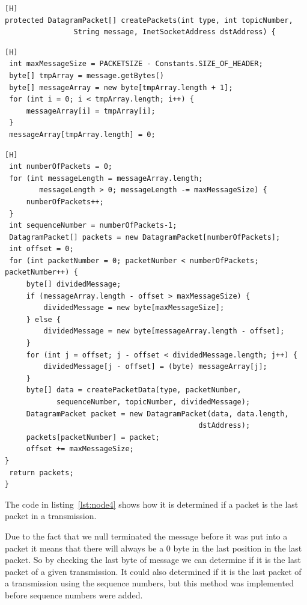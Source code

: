 \documentclass{article}
\begin{document}
\begin{lstlisting}[caption={[Sample Code 2]This is the function header for createPackets() method}, label={lst:node1}][H]
protected DatagramPacket[] createPackets(int type, int topicNumber, 
				String message, InetSocketAddress dstAddress) {
\end{lstlisting}
\begin{lstlisting}[caption={[Sample Code 2]This code takes the message string and ensures that it is null terminated, this is helpful for packet handling on the receiving side of the communication}, label={lst:node2}][H]
 int maxMessageSize = PACKETSIZE - Constants.SIZE_OF_HEADER;
 byte[] tmpArray = message.getBytes()
 byte[] messageArray = new byte[tmpArray.length + 1];
 for (int i = 0; i < tmpArray.length; i++) {
	 messageArray[i] = tmpArray[i];
 }
 messageArray[tmpArray.length] = 0;
\end{lstlisting}
\begin{lstlisting}[caption={[Sample Code 2]A for-loop is used to calculate how many packets are required to send the message. After this a second for-loop is used to split the message array up into separate packets, only if the message was too long for a single packet}, label={lst:node3}][H]
 int numberOfPackets = 0;
 for (int messageLength = messageArray.length; 
		messageLength > 0; messageLength -= maxMessageSize) {
	 numberOfPackets++;
 }
 int sequenceNumber = numberOfPackets-1;
 DatagramPacket[] packets = new DatagramPacket[numberOfPackets];
 int offset = 0;
 for (int packetNumber = 0; packetNumber < numberOfPackets; packetNumber++) {
	 byte[] dividedMessage;
	 if (messageArray.length - offset > maxMessageSize) {
	  	 dividedMessage = new byte[maxMessageSize];
	 } else {
		 dividedMessage = new byte[messageArray.length - offset];
	 }
	 for (int j = offset; j - offset < dividedMessage.length; j++) {
		 dividedMessage[j - offset] = (byte) messageArray[j];
	 }
	 byte[] data = createPacketData(type, packetNumber, 
			sequenceNumber, topicNumber, dividedMessage);
	 DatagramPacket packet = new DatagramPacket(data, data.length,
											 dstAddress);
	 packets[packetNumber] = packet;
	 offset += maxMessageSize;
}
 return packets;
}
\end{lstlisting}

The code in listing~\ref{lst:node4} shows how it is determined if a packet is the last packet in a transmission.

Due to the fact that we null terminated the message before it was put into a packet it means that there will always be a 0 byte in the last position in the last packet. So by checking the last byte of message we can determine if it is the last packet of a given transmission. It could also determined if it is the last packet of a transmission using the sequence numbers, but this method was implemented before sequence numbers were added.
\end{document}
